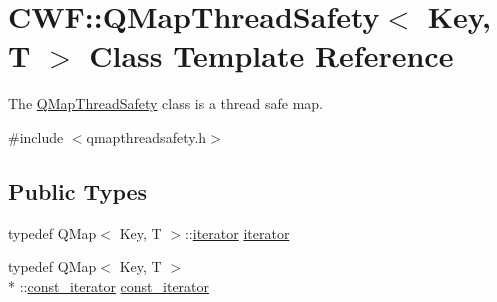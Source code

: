 \hypertarget{class_c_w_f_1_1_q_map_thread_safety}{\section{C\+W\+F\+:\+:Q\+Map\+Thread\+Safety$<$ Key, T $>$ Class Template Reference}
\label{class_c_w_f_1_1_q_map_thread_safety}
}


The \hyperlink{class_c_w_f_1_1_q_map_thread_safety}{Q\+Map\+Thread\+Safety} class is a thread safe map.  




{\ttfamily \#include $<$qmapthreadsafety.\+h$>$}

\subsection*{Public Types}
\begin{DoxyCompactItemize}
\item 
typedef Q\+Map$<$ Key, T $>$\+::\hyperlink{class_c_w_f_1_1_q_map_thread_safety_a3c4ab1dfd3da9557e0f2ea9e480466f9}{iterator} \hyperlink{class_c_w_f_1_1_q_map_thread_safety_a3c4ab1dfd3da9557e0f2ea9e480466f9}{iterator}
\item 
typedef Q\+Map$<$ Key, T $>$\\*
\+::\hyperlink{class_c_w_f_1_1_q_map_thread_safety_ae9f60ca27b6f4af8753cf15211fe5c70}{const\+\_\+iterator} \hyperlink{class_c_w_f_1_1_q_map_thread_safety_ae9f60ca27b6f4af8753cf15211fe5c70}{const\+\_\+iterator}
\end{DoxyCompactItemize}

